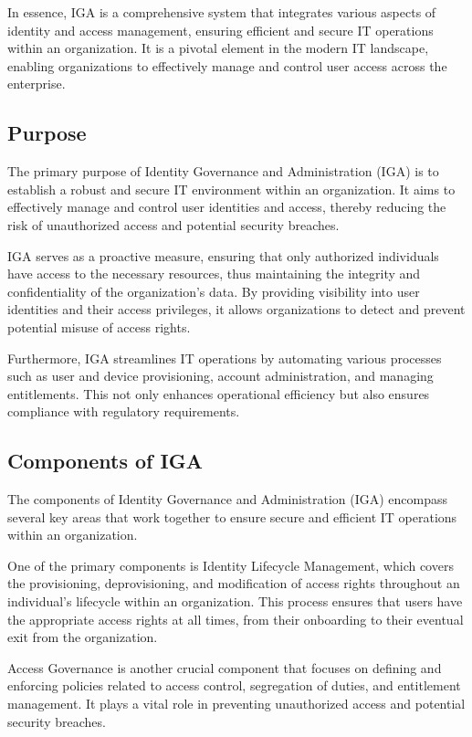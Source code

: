 In essence, IGA is a comprehensive system that integrates various aspects of identity and access management, ensuring efficient and secure IT operations within an organization. It is a pivotal element in the modern IT landscape, enabling organizations to effectively manage and control user access across the enterprise.


\subsection{Purpose}
\label{sec:Template}

The primary purpose of Identity Governance and Administration (IGA) is to establish a robust and secure IT environment within an organization. It aims to effectively manage and control user identities and access, thereby reducing the risk of unauthorized access and potential security breaches.

IGA serves as a proactive measure, ensuring that only authorized individuals have access to the necessary resources, thus maintaining the integrity and confidentiality of the organization’s data. By providing visibility into user identities and their access privileges, it allows organizations to detect and prevent potential misuse of access rights.

Furthermore, IGA streamlines IT operations by automating various processes such as user and device provisioning, account administration, and managing entitlements. This not only enhances operational efficiency but also ensures compliance with regulatory requirements.

\subsection{Components of IGA}
\label{sec:Template}

The components of Identity Governance and Administration (IGA) encompass several key areas that work together to ensure secure and efficient IT operations within an organization.

One of the primary components is Identity Lifecycle Management, which covers the provisioning, deprovisioning, and modification of access rights throughout an individual's lifecycle within an organization. This process ensures that users have the appropriate access rights at all times, from their onboarding to their eventual exit from the organization.

Access Governance is another crucial component that focuses on defining and enforcing policies related to access control, segregation of duties, and entitlement management. It plays a vital role in preventing unauthorized access and potential security breaches.


